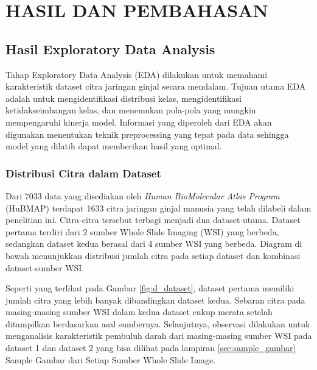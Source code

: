 \chapter{HASIL DAN PEMBAHASAN}

\section{Hasil Exploratory Data Analysis}
\label{sec:hasil-eda}

\noindent Tahap Exploratory Data Analysis (EDA) dilakukan untuk memahami karakteristik dataset citra jaringan ginjal secara mendalam. Tujuan utama EDA adalah untuk mengidentifikasi distribusi kelas, mengidentifikasi ketidakseimbangan kelas, dan menemukan pola-pola yang mungkin mempengaruhi kinerja model. Informasi yang diperoleh dari EDA akan digunakan menentukan teknik preprocessing yang tepat pada data sehingga model yang dilatih dapat memberikan hasil yang optimal.

\subsection{Distribusi Citra dalam Dataset}
\noindent Dari 7033 data yang disediakan oleh \textit{Human BioMolecular Atlas Program }(HuBMAP) terdapat 1633 citra jaringan ginjal manusia yang telah dilabeli dalam penelitian ini. Citra-citra tersebut terbagi menjadi dua dataset utama. Dataset pertama terdiri dari 2 sumber Whole Slide Imaging (WSI) yang berbeda, sedangkan dataset kedua berasal dari 4 sumber WSI yang berbeda. Diagram di bawah menunjukkan distribusi jumlah citra pada setiap dataset dan kombinasi dataset-sumber WSI.


\noindent Seperti yang terlihat pada Gambar \ref{fig:d_dataset}, dataset pertama memiliki jumlah citra yang lebih banyak dibandingkan dataset kedua. Sebaran citra pada masing-masing sumber WSI dalam kedua dataset cukup merata setelah ditampilkan berdasarkan asal sumbernya. Selanjutnya, observasi dilakukan untuk menganalisis karakteristik pembuluh darah dari masing-masing sumber WSI pada dataset 1 dan dataset 2 yang bisa dilihat pada lampiran \ref{sec:sample_gambar} Sample Gambar dari Setiap Sumber Whole Slide Image.


